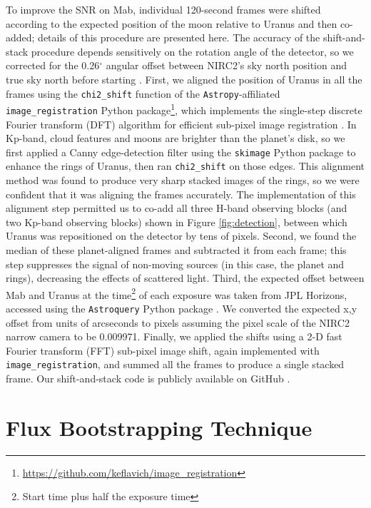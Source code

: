 \documentclass[preprint]{aastex631}
\begin{document}
To improve the SNR on Mab, individual 120-second frames were shifted according to the expected position of the moon relative to Uranus and then co-added; details of this procedure are presented here. The accuracy of the shift-and-stack procedure depends sensitively on the rotation angle of the detector, so we corrected for the 0.26$^\circ$ angular offset between NIRC2's sky north position and true sky north before starting \citep{service16}. First, we aligned the position of Uranus in all the frames using the \texttt{chi2\_shift} function of the \texttt{Astropy}-affiliated \texttt{image\_registration} Python package\footnote{\url{https://github.com/keflavich/image_registration}}, which implements the single-step discrete Fourier transform (DFT) algorithm for efficient sub-pixel image registration \citep{guizarsicairos08}. In Kp-band, cloud features and moons are brighter than the planet's disk, so we first applied a Canny edge-detection filter using the \texttt{skimage} Python package \citep{skimage14} to enhance the rings of Uranus, then ran \texttt{chi2\_shift} on those edges. This alignment method was found to produce very sharp stacked images of the rings, so we were confident that it was aligning the frames accurately. The implementation of this alignment step permitted us to co-add all three H-band observing blocks (and two Kp-band observing blocks) shown in Figure \ref{fig:detection}, between which Uranus was repositioned on the detector by tens of pixels.  Second, we found the median of these planet-aligned frames and subtracted it from each frame; this step suppresses the signal of non-moving sources (in this case, the planet and rings), decreasing the effects of scattered light. Third, the expected offset between Mab and Uranus at the time\footnote{Start time plus half the exposure time} of each exposure was taken from JPL Horizons, accessed using the \texttt{Astroquery} Python package \citep{ginsburg19}. We converted the expected x,y offset from units of arcseconds to pixels assuming the pixel scale of the NIRC2 narrow camera to be 0.009971\arcsec \citep{service16}. Finally, we applied the shifts using a 2-D fast Fourier transform (FFT) sub-pixel image shift, again implemented with \texttt{image\_registration}, and summed all the frames to produce a single stacked frame. Our shift-and-stack code is publicly available on GitHub \citep{molter23}.


\section{Flux Bootstrapping Technique}
\label{s:bootstrapping}
\end{document}
